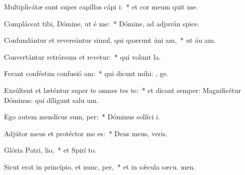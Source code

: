 \item Multiplicátæ sunt super capíllos cápi i:~* et cor meum quit me.
\item Compláceat tibi, Dómine, ut é me:~* Dómine, ad adjuván  spice.
\item Confundántur et revereántur simul, qui quærunt áni am,~* ut áu am.
\item Convertántur retrórsum et revetur:~* qui volunt  la.
\item Ferant conféstim confusió am:~* qui dicunt mihi: , ge.
\item Exsúltent et læténtur super te omnes tes te:~* et dicant semper: Magnificétur Dóminus: qui díligunt salu um.
\item Ego autem mendícus sum,  per:~* Dóminus sollíci  i.
\item Adjútor meus et protéctor me  es:~* Deus meus,  veris.
\item Glória Patri,  lio,~* et Spirí to.
\item Sicut erat in princípio, et nunc,  per,~* et in sǽcula sæcu. men.
